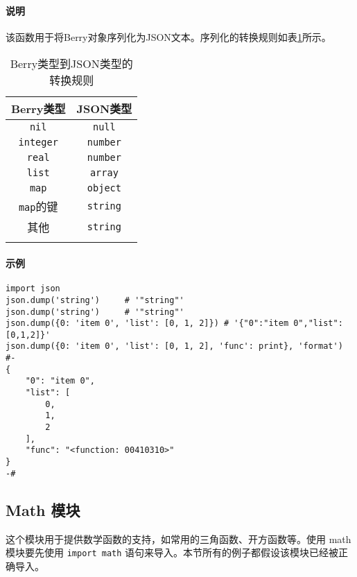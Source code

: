 \paragraph{说明}
该函数用于将Berry对象序列化为JSON文本。序列化的转换规则如表\ref{tab::berry2json_rule}所示。
\begin{table}[htb]
    \centering
    \setlength{\tabcolsep}{18mm}
    \begin{tabular}{cc} \Xhline{1pt}
        \textbf{Berry类型} & \textbf{JSON类型} \\ \hline
        \texttt{nil} & \texttt{null} \\
        \texttt{integer} & \texttt{number} \\
        \texttt{real} & \texttt{number} \\
        \texttt{list} & \texttt{array} \\
        \texttt{map} & \texttt{object} \\
        \texttt{map}的键 & \texttt{string} \\
        其他 & \texttt{string} \\
        \Xhline{1pt}
    \end{tabular}
    \caption{Berry类型到JSON类型的转换规则}
    \label{tab::berry2json_rule}
\end{table}

\paragraph{示例}
\begin{lstlisting}[language=berry, numbers=none]
import json
json.dump('string')     # '"string"'
json.dump('string')     # '"string"'
json.dump({0: 'item 0', 'list': [0, 1, 2]}) # '{"0":"item 0","list":[0,1,2]}'
json.dump({0: 'item 0', 'list': [0, 1, 2], 'func': print}, 'format')
#-
{
    "0": "item 0",
    "list": [
        0,
        1,
        2
    ],
    "func": "<function: 00410310>"
}
-#
\end{lstlisting}

\subsection{Math 模块}

这个模块用于提供数学函数的支持，如常用的三角函数、开方函数等。使用 math 模块要先使用 \texttt{import math} 语句来导入。本节所有的例子都假设该模块已经被正确导入。


